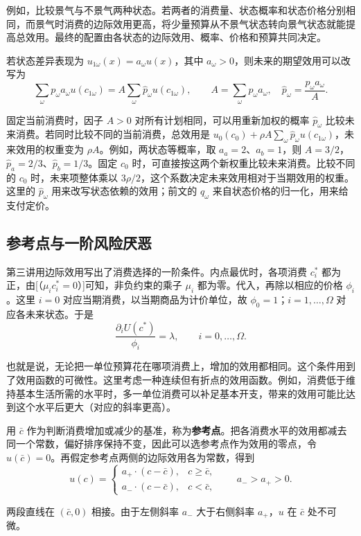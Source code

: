例如，比较景气与不景气两种状态。若两者的消费量、状态概率和状态价格分别相同，而景气时消费的边际效用更高，将少量预算从不景气状态转向景气状态就能提高总效用。最终的配置由各状态的边际效用、概率、价格和预算共同决定。

若状态差异表现为 $u_{1\omega}(x)=a_\omega u(x)$，其中 $a_\omega>0$，则未来的期望效用可以改写为
\[
 \sum_\omega p_\omega a_\omega u(c_{1\omega})
 =A\sum_\omega \widehat p_\omega u(c_{1\omega}),\qquad
 A=\sum_\omega p_\omega a_\omega,\quad
 \widehat p_\omega=\frac{p_\omega a_\omega}{A}.
\]

固定当前消费时，因子 $A>0$ 对所有计划相同，可以用重新加权的概率 $\widehat p_\omega$ 比较未来消费。若同时比较不同的当前消费，总效用是 $u_0(c_0)+\rho A\sum_\omega\widehat p_\omega u(c_{1\omega})$，未来效用的权重变为 $\rho A$。例如，两状态等概率，取 $a_a=2$、$a_b=1$，则 $A=3/2$，$\widehat p_a=2/3$、$\widehat p_b=1/3$。固定 $c_0$ 时，可直接按这两个新权重比较未来消费。比较不同的 $c_0$ 时，未来项整体乘以 $3\rho/2$，这个系数决定未来效用相对于当期效用的权重。这里的 $\widehat p_\omega$ 用来改写状态依赖的效用；前文的 $q_\omega$ 来自状态价格的归一化，用来给支付定价。

\subsection{参考点与一阶风险厌恶}
第三讲用边际效用写出了消费选择的一阶条件。内点最优时，各项消费 $c_i^*$ 都为正，由[（$\mu_i c_i^*=0$）]可知，非负约束的乘子 $\mu_i$ 都为零。代入，再除以相应的价格 $\phi_i$。这里 $i=0$ 对应当期消费，以当期商品为计价单位，故 $\phi_0=1$；$i=1,\ldots,\Omega$ 对应各未来状态。于是
\[
 \frac{\partial_i U(c^*)}{\phi_i}=\lambda,\qquad i=0,\ldots,\Omega.
\]

也就是说，无论把一单位预算花在哪项消费上，增加的效用都相同。这个条件用到了效用函数的可微性。这里考虑一种连续但有折点的效用函数。例如，消费低于维持基本生活所需的水平时，多一单位消费可以补足基本开支，带来的效用可能比达到这个水平后更大（对应的斜率更高）。

\begin{tcolorbox}[knowledge,title=参考点处的折点]
用 $\bar c$ 作为判断消费增加或减少的基准，称为\textbf{参考点}。把各消费水平的效用都减去同一个常数，偏好排序保持不变，因此可以选参考点作为效用的零点，令 $u(\bar c)=0$。再假定参考点两侧的边际效用各为常数，得到
\[
 u(c)=\begin{cases}
 a_+\cdot(c-\bar c),&c\ge\bar c,\\
 a_-\cdot(c-\bar c),&c<\bar c,
 \end{cases}
 \qquad a_->a_+>0.
\]

两段直线在 $(\bar c,0)$ 相接。由于左侧斜率 $a_-$ 大于右侧斜率 $a_+$，$u$ 在 $\bar c$ 处不可微。
\end{tcolorbox}

